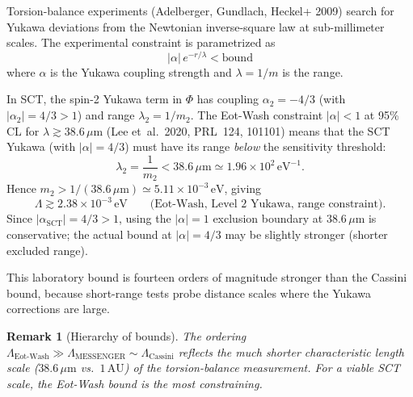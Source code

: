 \documentclass[11pt,a4paper]{article}
\newtheorem{remark}[theorem]{Remark}
\begin{document}
Torsion-balance experiments (Adelberger, Gundlach, Heckel+ 2009) search
for Yukawa deviations from the Newtonian inverse-square law at sub-millimeter
scales.  The experimental constraint is parametrized as
\begin{equation}
  |\alpha|\,e^{-r/\lambda} < \text{bound}
\end{equation}
where $\alpha$ is the Yukawa coupling strength and $\lambda = 1/m$ is the
range.

In SCT, the spin-2 Yukawa term in $\Phi$ has coupling $\alpha_2 = -4/3$
(with $|\alpha_2| = 4/3 > 1$) and range $\lambda_2 = 1/m_2$.  The
Eot-Wash constraint $|\alpha| < 1$ at 95\% CL for
$\lambda \gtrsim 38.6\,\mu\mathrm{m}$ (Lee et~al.\ 2020, PRL~124, 101101)
means that the SCT Yukawa (with $|\alpha| = 4/3$) must have its range
\emph{below} the sensitivity threshold:
\begin{equation}
  \lambda_2 = \frac{1}{m_2} < 38.6\,\mu\mathrm{m}
  \simeq 1.96 \times 10^{2}\,\mathrm{eV}^{-1}.
\end{equation}
Hence $m_2 > 1/(38.6\,\mu\mathrm{m}) \simeq 5.11 \times 10^{-3}\,\mathrm{eV}$,
giving
\begin{equation}\label{eq:eotwash-bound}
  \boxed{
  \Lambda \gtrsim 2.38 \times 10^{-3}\,\mathrm{eV}
  \qquad \text{(Eot-Wash, Level~2 Yukawa, range constraint).}}
\end{equation}
Since $|\alpha_\mathrm{SCT}| = 4/3 > 1$, using the $|\alpha| = 1$ exclusion
boundary at $38.6\,\mu\mathrm{m}$ is conservative; the actual bound at
$|\alpha| = 4/3$ may be slightly stronger (shorter excluded range).

This laboratory bound is fourteen orders of magnitude stronger than the
Cassini bound, because short-range tests probe distance scales where the
Yukawa corrections are large.

\begin{remark}[Hierarchy of bounds]
The ordering $\Lambda_\mathrm{Eot\text{-}Wash} \gg \Lambda_\mathrm{MESSENGER}
\sim \Lambda_\mathrm{Cassini}$ reflects the much shorter characteristic length
scale ($38.6\,\mu\mathrm{m}$ vs.\ $1\,\mathrm{AU}$) of the torsion-balance
measurement.  For a viable SCT scale, the Eot-Wash bound is the most
constraining.
\end{remark}
\end{document}
